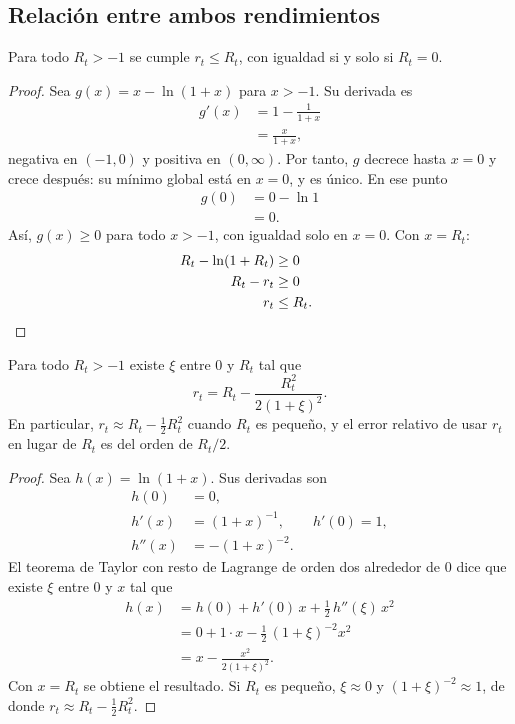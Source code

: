 \subsection{Relación entre ambos rendimientos}

\begin{proposicion}\label{prop:desigualdad}
Para todo $R_t>-1$ se cumple $r_t\le R_t$, con igualdad si y solo si $R_t=0$.
\end{proposicion}

\begin{proof}
Sea $g(x)=x-\ln(1+x)$ para $x>-1$. Su derivada es
\begin{align*}
  g'(x) &= 1-\frac{1}{1+x}\\
        &= \frac{x}{1+x},
\end{align*}
negativa en $(-1,0)$ y positiva en $(0,\infty)$. Por tanto, $g$ decrece hasta $x=0$ y crece después: su
mínimo global está en $x=0$, y es único. En ese punto
\begin{align*}
  g(0) &= 0-\ln 1\\
       &= 0.
\end{align*}
Así, $g(x)\ge0$ para todo $x>-1$, con igualdad solo en $x=0$. Con $x=R_t$:
\begin{align*}
  R_t-\ln(1+R_t) &\ge 0\\
  R_t-r_t        &\ge 0\\
  r_t            &\le R_t. && \qedhere
\end{align*}
\end{proof}

\begin{proposicion}\label{prop:taylor}
Para todo $R_t>-1$ existe $\xi$ entre $0$ y $R_t$ tal que
\[
  r_t=R_t-\frac{R_t^2}{2(1+\xi)^2}.
\]
En particular, $r_t\approx R_t-\tfrac12R_t^2$ cuando $R_t$ es pequeño, y el error relativo de usar
$r_t$ en lugar de $R_t$ es del orden de $R_t/2$.
\end{proposicion}

\begin{proof}
Sea $h(x)=\ln(1+x)$. Sus derivadas son
\begin{align*}
  h(0)   &= 0,\\
  h'(x)  &= (1+x)^{-1}, \qquad h'(0)=1,\\
  h''(x) &= -(1+x)^{-2}.
\end{align*}
El teorema de Taylor con resto de Lagrange de orden dos alrededor de $0$ dice que existe $\xi$ entre $0$ y
$x$ tal que
\begin{align*}
  h(x) &= h(0)+h'(0)\,x+\tfrac12\,h''(\xi)\,x^2\\
       &= 0+1\cdot x-\tfrac12\,(1+\xi)^{-2}x^2\\
       &= x-\frac{x^2}{2(1+\xi)^2}.
\end{align*}
Con $x=R_t$ se obtiene el resultado. Si $R_t$ es pequeño, $\xi\approx0$ y $(1+\xi)^{-2}\approx1$, de
donde $r_t\approx R_t-\tfrac12R_t^2$.
\end{proof}

